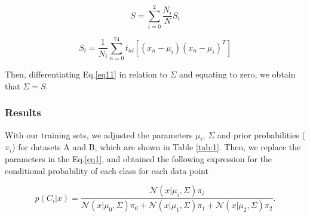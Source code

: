 \documentclass{article}
\begin{document}
\begin{equation}
\label{eq12}
S = \sum_{i=0}^{2} \dfrac{N_i}{N} S_i
\end{equation}

\begin{equation}
\label{eq13}
S_i = \dfrac{1}{N_i} \sum_{n=0}^{74} t_{ni} \left[(x_n - \mu_i)(x_n - \mu_i)^T\right]
\end{equation}

Then, differentiating Eq.\eqref{eq11} in relation to $\Sigma$ and equating to zero, we obtain that $\Sigma = S$.

\subsubsection{Results}

With our training sets, we adjusted the parameters $\mu_i$, $\Sigma$ and prior probabilities ($\pi_i$) for datasets A and B, which are shown in Table \ref{tab:1}. Then, we replace the parameters in the Eq.\eqref{eq1}, and obtained the following expression for the conditional probability of each class for each data point

\begin{equation}
  \label{eq14}
  p(C_i|x) = \dfrac{\mathcal{N}(x|\mu_{i},\Sigma) \pi_i}{\mathcal{N}(x|\mu_{0},\Sigma) \pi_0 + \mathcal{N}(x|\mu_{1},\Sigma) \pi_1 + \mathcal{N}(x|\mu_{2},\Sigma) \pi_2}.
\end{equation}
\end{document}
